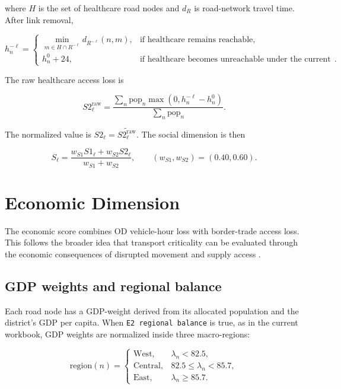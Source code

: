 \documentclass[11pt,a4paper]{article}
\begin{document}
where $H$ is the set of healthcare road nodes and $d_R$ is road-network travel
time. After link removal,

\begin{equation}
h^{-\ell}_n=
\begin{cases}
\min_{m\in H\cap R^{-\ell}} d_{R^{-\ell}}(n,m),
& \text{if healthcare remains reachable},\\
h^0_n+24,
& \text{if healthcare becomes unreachable under the current penalty setting}.
\end{cases}
\label{eq:mlpi-health-after}
\end{equation}

The raw healthcare access loss is

\begin{equation}
S2^{\mathrm{raw}}_{\ell}
=\frac{\sum_n \mathrm{pop}_n \max(0,h^{-\ell}_n-h^0_n)}
{\sum_n \mathrm{pop}_n}.
\label{eq:mlpi-s2-raw}
\end{equation}

The normalized value is $S2_{\ell}=\widetilde{S2^{\mathrm{raw}}_{\ell}}$.
The social dimension is then

\begin{equation}
S_{\ell}
=\frac{w_{S1}S1_{\ell}+w_{S2}S2_{\ell}}
        {w_{S1}+w_{S2}},
\qquad
(w_{S1},w_{S2})=(0.40,0.60).
\label{eq:mlpi-social}
\end{equation}

\section{Economic Dimension}

The economic score combines OD vehicle-hour loss with border-trade access
loss. This follows the broader idea that transport criticality can be evaluated
through the economic consequences of disrupted movement and supply access
\cite{colon2021}.

\subsection{GDP weights and regional balance}

Each road node has a GDP-weight derived from its allocated population and the
district's GDP per capita. When \texttt{E2 regional balance} is true, as in the
current workbook, GDP weights are normalized inside three macro-regions:

\begin{equation}
\mathrm{region}(n)=
\begin{cases}
\mathrm{West}, & \lambda_n < 82.5,\\
\mathrm{Central}, & 82.5 \leq \lambda_n < 85.7,\\
\mathrm{East}, & \lambda_n \geq 85.7.
\end{cases}
\label{eq:mlpi-region}
\end{equation}
\end{document}
